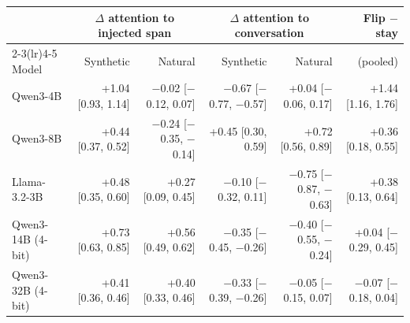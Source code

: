 \begin{tabular}{lrrrrr}
\toprule
& \multicolumn{2}{c}{$\Delta$ attention to injected span} & \multicolumn{2}{c}{$\Delta$ attention to conversation} & Flip $-$ stay \\
\cmidrule(lr){2-3}\cmidrule(lr){4-5}
Model & Synthetic & Natural & Synthetic & Natural & (pooled) \\
\midrule
Qwen3-4B & +1.04 [0.93, 1.14] & $-$0.02 [$-$0.12, 0.07] & $-$0.67 [$-$0.77, $-$0.57] & +0.04 [$-$0.06, 0.17] & +1.44 [1.16, 1.76] \\
Qwen3-8B & +0.44 [0.37, 0.52] & $-$0.24 [$-$0.35, $-$0.14] & +0.45 [0.30, 0.59] & +0.72 [0.56, 0.89] & +0.36 [0.18, 0.55] \\
Llama-3.2-3B & +0.48 [0.35, 0.60] & +0.27 [0.09, 0.45] & $-$0.10 [$-$0.32, 0.11] & $-$0.75 [$-$0.87, $-$0.63] & +0.38 [0.13, 0.64] \\
Qwen3-14B (4-bit) & +0.73 [0.63, 0.85] & +0.56 [0.49, 0.62] & $-$0.35 [$-$0.45, $-$0.26] & $-$0.40 [$-$0.55, $-$0.24] & +0.04 [$-$0.29, 0.45] \\
Qwen3-32B (4-bit) & +0.41 [0.36, 0.46] & +0.40 [0.33, 0.46] & $-$0.33 [$-$0.39, $-$0.26] & $-$0.05 [$-$0.15, 0.07] & $-$0.07 [$-$0.18, 0.04] \\
\bottomrule
\end{tabular}
